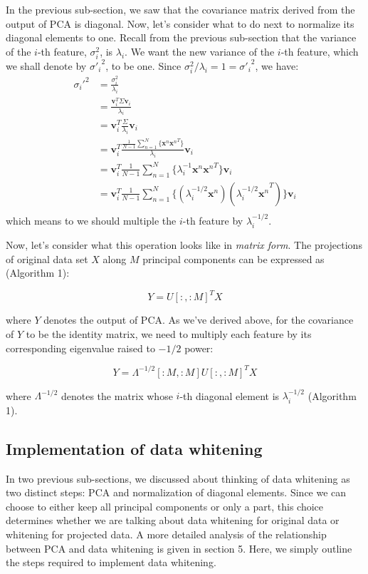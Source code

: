 \documentclass{article}
\newcommand{\vecv}{\boldsymbol{v}}
\newcommand{\vecx}{\boldsymbol{x}}
\begin{document}
In the previous sub-section, we saw that the covariance matrix derived from the output of PCA is diagonal. Now, let's consider what to do next to normalize its diagonal elements to one. Recall from the previous sub-section that the variance of the $i$-th feature, $\sigma_i^2$, is $\lambda_i$. We want the new variance of the $i$-th feature, which we shall denote by ${ \sigma'_i}^2$, to be one. Since $\sigma_i^2 / \lambda_i = 1 = { \sigma'_i}^2$, we have:
\begin{align*}
\sigma_i'^2 &= \frac{\sigma_i^2}{\lambda_i} \\
&= \frac{\vecv_i^T \Sigma \vecv_i}{\lambda_i} \\
&= \vecv_i^T \frac{\Sigma}{\lambda_i} \vecv_i \\
&= \vecv_i^T \frac{\frac{1}{N-1} \sum_{n=1}^N \{ \vecx^n {\vecx^n}^T \} }{\lambda_i} \vecv_i \\
&= \vecv_i^T \frac{1}{N-1} \sum_{n=1}^N \{ \lambda_i^{-1} \vecx^n {\vecx^n}^T \} \vecv_i \\
&= \vecv_i^T \frac{1}{N-1} \sum_{n=1}^N \{ (\lambda_i^{-1/2} \vecx^n)({\lambda_i^{-1/2} \vecx^n}^T) \} \vecv_i \\
\end{align*}
which means to we should multiple the $i$-th feature by $\lambda_i^{-1/2}$.

\vspace{3mm}
Now, let's consider what this operation looks like in \textit{matrix form}. The projections of original data set $X$ along $M$ principal components can be expressed as (Algorithm 1):

$$Y = U[:,{:}M]^T X$$ 

where $Y$ denotes the output of PCA. As we've derived above, for the covariance of $Y$ to be the identity matrix, we need to multiply each feature by its corresponding eigenvalue raised to $-1/2$ power:

$$Y = \Lambda^{-1/2}[{:}M, {:}M] U[:,{:}M]^T X$$ 

where $\Lambda^{-1/2}$ denotes the matrix whose $i$-th diagonal element is $\lambda_i^{-1/2}$ (Algorithm 1).

\subsection{Implementation of data whitening}

In two previous sub-sections, we discussed about thinking of data whitening as two distinct steps: PCA and normalization of diagonal elements. Since we can choose to either keep all principal components or only a part, this choice determines whether we are talking about data whitening for original data or whitening for projected data. A more detailed analysis of the relationship between PCA and data whitening is given in section 5. Here, we simply outline the steps required to implement data whitening.
\end{document}
